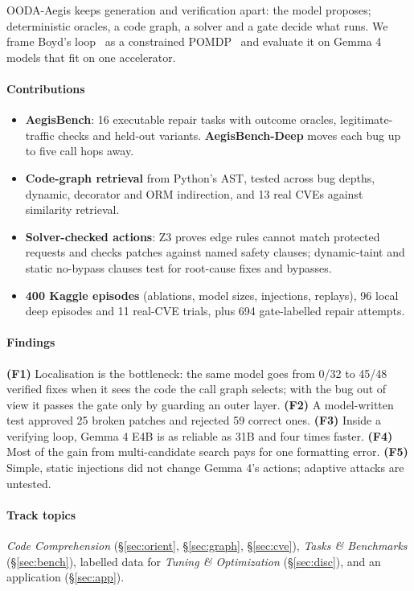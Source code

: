 \documentclass[journal]{IEEEtran}
\begin{document}
OODA-Aegis keeps generation and verification apart: the model proposes; deterministic oracles, a code graph, a solver and a gate decide what runs. We frame Boyd's loop~\cite{boyd} as a constrained POMDP~\cite{altman} and evaluate it on Gemma 4 models that fit on one accelerator.

\paragraph{Contributions}
\begin{itemize}
\item \textbf{AegisBench}: 16 executable repair tasks with outcome oracles, legitimate-traffic checks and held-out variants. \textbf{AegisBench-Deep} moves each bug up to five call hops away.
\item \textbf{Code-graph retrieval} from Python's AST, tested across bug depths, dynamic, decorator and ORM indirection, and 13 real CVEs against similarity retrieval.
\item \textbf{Solver-checked actions}: Z3 proves edge rules cannot match protected requests and checks patches against named safety clauses; dynamic-taint and static no-bypass clauses test for root-cause fixes and bypasses.
\item \textbf{400 Kaggle episodes} (ablations, model sizes, injections, replays), 96 local deep episodes and 11 real-CVE trials, plus 694 gate-labelled repair attempts.
\end{itemize}

\paragraph{Findings}
\textbf{(F1)} Localisation is the bottleneck: the same model goes from 0/32 to 45/48 verified fixes when it sees the code the call graph selects; with the bug out of view it passes the gate only by guarding an outer layer. \textbf{(F2)} A model-written test approved 25 broken patches and rejected 59 correct ones. \textbf{(F3)} Inside a verifying loop, Gemma 4 E4B is as reliable as 31B and four times faster. \textbf{(F4)} Most of the gain from multi-candidate search pays for one formatting error. \textbf{(F5)} Simple, static injections did not change Gemma 4's actions; adaptive attacks are untested.

\paragraph{Track topics} \emph{Code Comprehension} (\S\ref{sec:orient}, \S\ref{sec:graph}, \S\ref{sec:cve}), \emph{Tasks \& Benchmarks} (\S\ref{sec:bench}), labelled data for \emph{Tuning \& Optimization} (\S\ref{sec:disc}), and an application (\S\ref{sec:app}).
\end{document}
